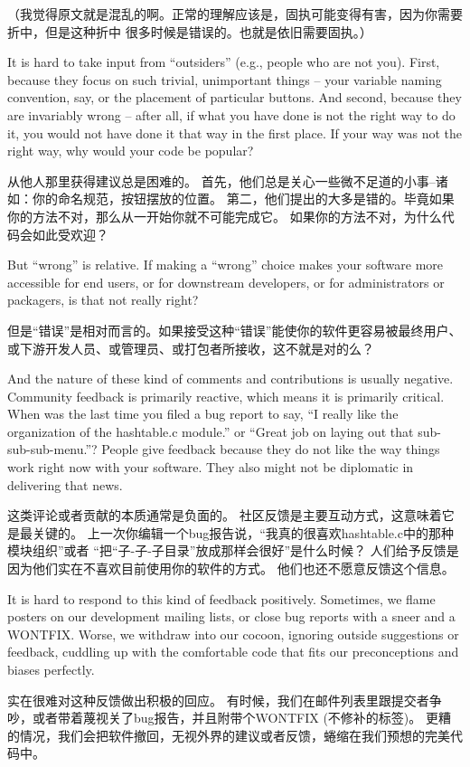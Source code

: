 （我觉得原文就是混乱的啊。正常的理解应该是，固执可能变得有害，因为你需要折中，但是这种折中
很多时候是错误的。也就是依旧需要固执。）

It is hard to take input from ``outsiders'' (e.g., people who are not you). First, because they focus on such trivial, unimportant things -- your variable naming convention, say, or the placement of particular buttons. And second, because they are invariably wrong -- after all, if what you have done is not the right way to do it, you would not have done it that way in the first place. If your way was not the right way, why would your code be popular?

从他人那里获得建议总是困难的。
首先，他们总是关心一些微不足道的小事--诸如：你的命名规范，按钮摆放的位置。
第二，他们提出的大多是错的。毕竟如果你的方法不对，那么从一开始你就不可能完成它。
如果你的方法不对，为什么代码会如此受欢迎？

But ``wrong'' is relative. If making a ``wrong'' choice makes your software more
accessible for end users, or for downstream developers, or for administrators or
packagers, is that not really right?

但是``错误''是相对而言的。如果接受这种``错误''能使你的软件更容易被最终用户、
或下游开发人员、或管理员、或打包者所接收，这不就是对的么？

And the nature of these kind of comments and contributions is usually negative.
Community feedback is primarily reactive, which means it is primarily critical.
When was the last time you filed a bug report to say, ``I really like the
organization of the hashtable.c module.'' or ``Great job on laying out that
sub-sub-sub-menu.''? People give feedback because they do not like the way things work right now with your software. They also might not be diplomatic in
delivering that news.

这类评论或者贡献的本质通常是负面的。
社区反馈是主要互动方式，这意味着它是最关键的。
上一次你编辑一个bug报告说，``我真的很喜欢hashtable.c中的那种模块组织''或者
``把“子-子-子目录”放成那样会很好''是什么时候？
人们给予反馈是因为他们实在不喜欢目前使用你的软件的方式。
他们也还不愿意反馈这个信息。

It is hard to respond to this kind of feedback positively. Sometimes, we flame
posters on our development mailing lists, or close bug reports with a sneer and
a WONTFIX. Worse, we withdraw into our cocoon, ignoring outside suggestions or
feedback, cuddling up with the comfortable code that fits our preconceptions and
biases perfectly.

实在很难对这种反馈做出积极的回应。
有时候，我们在邮件列表里跟提交者争吵，或者带着蔑视关了bug报告，并且附带个WONTFIX
(不修补的标签)。
更糟的情况，我们会把软件撤回，无视外界的建议或者反馈，蜷缩在我们预想的完美代码中。

